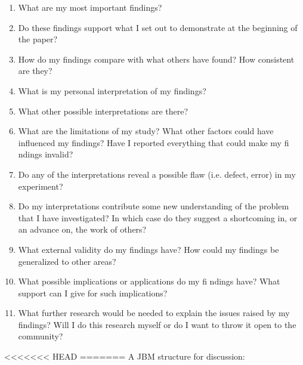 \begin{enumerate}
    \item
        What are my most important findings?
    \item
        Do these findings support what I set out to demonstrate at the beginning of the
        paper?
    \item
        How do my findings compare with what others have found? How consistent are
        they?
    \item
        What is my personal interpretation of my findings?
    \item
        What other possible interpretations are there?
    \item
        What are the limitations of my study? What other factors could have influenced
        my findings? Have I reported everything that could make my fi ndings invalid?
    \item
        Do any of the interpretations reveal a possible flaw (i.e. defect, error) in my
        experiment?
    \item
        Do my interpretations contribute some new understanding of the problem that I
        have investigated? In which case do they suggest a shortcoming in, or an
        advance on, the work of others?
    \item
        What external validity do my findings have? How could my findings be 
        generalized to other areas?
    \item
        What possible implications or applications do my fi ndings have? What support
        can I give for such implications?
    \item
        What further research would be needed to explain the issues raised by my 
        findings? Will I do this research myself or do I want to throw it open to the
        community?
\end{enumerate}
<<<<<<< HEAD
=======
A JBM structure for discussion:
